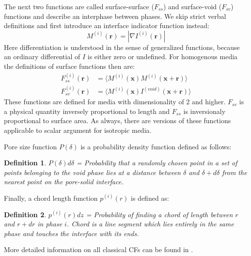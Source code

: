 \documentclass[1p]{elsarticle}
\newtheorem{definition}{Definition}
\begin{document}
The next two functions are called surface-surface ($F_{ss}$) and surface-void
($F_{sv}$) functions and describe an interphase between phases. We skip strict verbal
definitions and first introduce an interface indicator function instead:
\begin{equation*}
  M^{(i)}(\bm{r}) = | \nabla I^{(i)}(\bm{r}) |
\end{equation*}
Here differentiation is understood in the sense of generalized functions,
because an ordinary differential of $I$ is either zero or undefined. For
homogenous media the definitions of surface functions then are:
\begin{align}
  F_{ss}^{(i)}(\bm{r}) &= \langle M^{(i)}(\bm{x}) M^{(i)}(\bm{x} +
  \bm{r}) \rangle \label{eq:fss-def} \\
  F_{sv}^{(i)}(\bm{r}) &= \langle M^{(i)}(\bm{x}) I^{(void)}(\bm{x}
  + \bm{r}) \rangle \label{eq:fsv-def}
\end{align}
These functions are defined for media with dimensionality of 2 and
higher. $F_{sv}$ is a physical quantity inversely proportional to length and
$F_{ss}$ is inversionaly proportional to surface area. As always, there are
versions of these functions applicable to scalar argument for isotropic media.

Pore size function $P(\delta)$ is a probability density function defined as
follows:
\begin{definition}
  $P(\delta)d\delta$ = Probability that a randomly chosen point in a set of points
  belonging to the void phase lies at a distance between $\delta$ and $\delta + d\delta$
  from the nearest point on the pore-solid interface.
\end{definition}

Finally, a chord length function $p^{(i)}(r)$ is defined as:
\begin{definition}
$p^{(i)}(r)dz$ = Probability of finding a chord of length between $r$ and $r+dr$
in phase $i$. Chord is a line segment which lies entirely in the same phase and
touches the interface with its ends.
\end{definition}

More detailed information on all classical CFs can be found in \cite{Torquato_book}.
\end{document}

